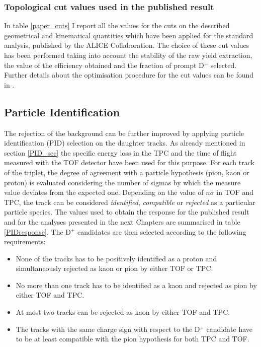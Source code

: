 \documentclass[b5paper,10pt,twoside,oldstyle,classica]{toptesi}
\begin{document}
\subsubsection{Topological cut values used in the published result}
In table \ref{paper_cuts} I report all the values for the cuts on the described geometrical and kinematical quantities which have been applied for the standard analysis, published by the ALICE Collaboration. The choice of these cut values has been performed taking into account the stability of the raw yield extraction, the value of the efficiency obtained and the fraction of prompt D$^+$ selected.
Further details about the optimisation procedure for the cut values can be found in \cite{Russo:2015xtz}.
\subsection{Particle Identification}
The rejection of the background can be further improved by applying particle identification (PID) selection on the daughter tracks. As already mentioned in section \ref{PID_sec} the specific energy loss in the TPC and the time of flight measured with the TOF detector have been used for this purpose. For each track of the triplet, the degree of agreement with a particle hypothesis (pion, kaon or proton) is evaluated considering the number of sigmas by which the measure value deviates from the expected one. Depending on the value of $n\sigma$ in TOF and TPC, the track can be considered \textit{identified}, \textit{compatible} or \textit{rejected} as a particular particle species. The values used to obtain the response for the published result and for the analyses presented in the next Chapters are summarised in table \ref{PIDresponse}.
The D$^+$ candidates are then selected according to the following requirements:
\begin{itemize}
 \item None of the tracks has to be positively identified as a proton and simultaneously rejected as kaon or pion by either TOF or TPC.
 \item No more than one track has to be identified as a kaon and rejected as pion by either TOF and TPC.
 \item At most two tracks can be rejected as kaon by either TOF and TPC.
 \item The tracks with the same charge sign with respect to the D$^+$ candidate have to be at least compatible with the pion hypothesis for both TPC and TOF.
 \end{itemize}
\end{document}
